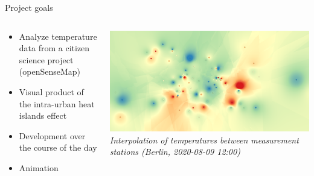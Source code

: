 \begin{frame}{Project goals}
\begin{columns}[T] %
	\begin{column}{.56\textwidth}
		\begin{itemize}
			\item Analyze temperature data from a citizen science project (openSenseMap)
			\item Visual product of the intra-urban heat islands effect
			\item Development over the course of the day
			\item Animation
		\end{itemize}
	\end{column}%
	\hfill%
	\begin{column}{.44\textwidth}
		\includegraphics[width=\linewidth]{../writeup/images/interpolation_idw.png}\\
		\textit{\footnotesize Interpolation of temperatures between measurement stations (Berlin, 2020-08-09 12:00)}
	\end{column}%
\end{columns}
\end{frame}
